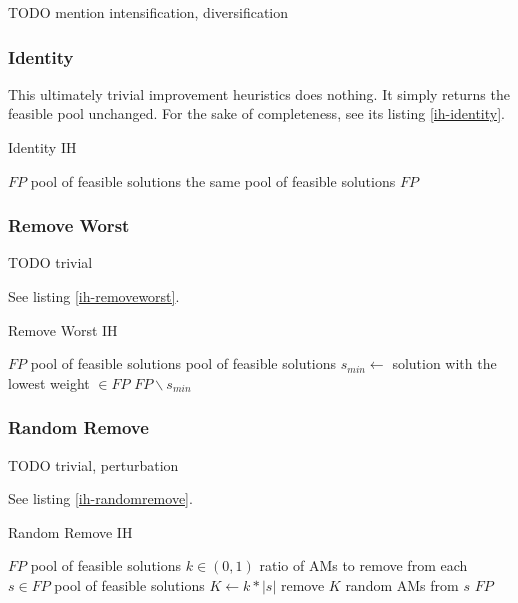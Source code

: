 \documentclass[a4paper,12pt,oneside]{report}
\begin{document}
TODO mention intensification, diversification

\subsubsection{Identity}

This ultimately trivial improvement heuristics does nothing. It simply returns the feasible pool unchanged. For the sake of completeness, see its listing \ref{ih-identity}.

\begin{algorithm}
\caption{Identity IH}
\label{ih-identity}
\begin{algorithmic}
\REQUIRE $FP$ pool of feasible solutions
\ENSURE the same pool of feasible solutions
\RETURN $FP$
\end{algorithmic}
\end{algorithm}

\subsubsection{Remove Worst}

TODO trivial

See listing \ref{ih-removeworst}.

\begin{algorithm}
\caption{Remove Worst IH}
\label{ih-removeworst}
\begin{algorithmic}
\REQUIRE $FP$ pool of feasible solutions
\ENSURE pool of feasible solutions
\STATE $s_{min} \gets $ solution with the lowest weight $\in FP$
\RETURN $FP \backslash s_{min}$
\end{algorithmic}
\end{algorithm}

\subsubsection{Random Remove}

TODO trivial, perturbation

See listing \ref{ih-randomremove}.

\begin{algorithm}
\caption{Random Remove IH}
\label{ih-randomremove}
\begin{algorithmic}
\REQUIRE $FP$ pool of feasible solutions
\REQUIRE $k \in (0,1)$ ratio of AMs to remove from each $s \in FP$
\ENSURE pool of feasible solutions
  \STATE $K \gets k * |s|$
  \STATE remove $K$ random AMs from $s$
\ENDFOR
\RETURN $FP$
\end{algorithmic}
\end{algorithm}
\end{document}
